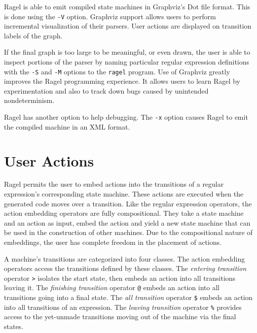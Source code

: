 \documentclass[letterpaper,11pt,oneside]{book}
\begin{document}

Ragel is able to emit compiled state machines in Graphviz's Dot file format.
This is done using the \verb|-V| option.
Graphviz support allows users to perform
incremental visualization of their parsers. User actions are displayed on
transition labels of the graph. 

If the final graph is too large to be
meaningful, or even drawn, the user is able to inspect portions of the parser
by naming particular regular expression definitions with the \verb|-S| and
\verb|-M| options to the \verb|ragel| program. Use of Graphviz greatly
improves the Ragel programming experience. It allows users to learn Ragel by
experimentation and also to track down bugs caused by unintended
nondeterminism.

Ragel has another option to help debugging. The \verb|-x| option causes Ragel
to emit the compiled machine in an XML format.

\chapter{User Actions}

Ragel permits the user to embed actions into the transitions of a regular
expression's corresponding state machine. These actions are executed when the
generated code moves over a transition.  Like the regular expression operators,
the action embedding operators are fully compositional. They take a state
machine and an action as input, embed the action and yield a new state machine
that can be used in the construction of other machines. Due to the
compositional nature of embeddings, the user has complete freedom in the
placement of actions.

A machine's transitions are categorized into four classes. The action embedding
operators access the transitions defined by these classes.  The {\em entering
transition} operator \verb|>| isolates the start state, then embeds an action
into all transitions leaving it. The {\em finishing transition} operator
\verb|@| embeds an action into all transitions going into a final state.  The
{\em all transition} operator \verb|$| embeds an action into all transitions of
an expression. The {\em leaving transition} operator \verb|%| provides access
to the yet-unmade transitions moving out of the machine via the final states. 
\end{document}
